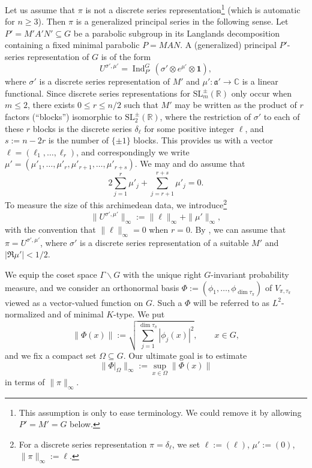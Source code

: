 \documentclass[11pt,oneside]{amsart}
\numberwithin{equation}{section}
\theoremstyle{remark}
\theoremstyle{plain}
\DeclareMathOperator{\Ind}{Ind}
\newcommand\SL{\mathrm{SL}}
\newcommand\RR{\mathbb{R}}
\newcommand\CC{\mathbb{C}}
\newcommand\mfa{\mathfrak{a}}
\newcommand\bs{\backslash}
\renewcommand\leq{\leqslant}
\renewcommand\geq{\geqslant}
\begin{document}
Let us assume that $\pi$ is not a discrete series representation\footnote{This assumption is only to ease terminology. We could remove it by allowing $P'=M'=G$ below.} (which is automatic for $n\geq 3$). Then $\pi$ is a generalized principal series in the following sense. Let $P' = M'A'N' \subseteq G$ be a parabolic subgroup in its Langlands decomposition containing
a fixed minimal parabolic $P = MAN$. A (generalized) principal $P'$-series representation of $G$ is of the form
\begin{equation}\label{eq:def-U-sigma'-mu'}
U^{\sigma',\mu'}=\Ind_{P'}^G(\sigma'\otimes e^{\mu'}\otimes\mathbf{1}),
\end{equation}
where $\sigma'$ is a discrete series representation of $M'$ and $\mu':\mfa'\to\CC$ is a linear functional. Since discrete series representations for $\SL_m^\pm(\RR)$ only occur when $m \leq 2$, there exists $0 \leq r \leq n/2$ such that $M'$ 
may be written as the product of $r$ factors (``blocks'') isomorphic to $\SL^{\pm}_2(\RR)$, where the restriction of $\sigma'$ to each 
of these $r$ blocks is the discrete series $\delta_{\ell}$ for some positive integer $\ell$,
and $s:=n- 2r$ is the number of $\{\pm 1\}$ blocks. This provides us with a vector ${\bm \ell} = (\ell_1, \ldots, \ell_r)$, and correspondingly we write $\mu' = (\mu'_1, \ldots, \mu'_r, \mu'_{r+ 1} , \ldots, \mu'_{r+s})$. We may and do assume that
\begin{equation}\label{eq:mu'-sum-0}
2\sum_{j=1}^{r} \mu'_j + \sum_{j=r+1}^{r+s} \mu'_j=0.
\end{equation}
To measure the size of this archimedean data, we introduce\footnote{For a discrete series representation $\pi=\delta_\ell$, we set $\bm\ell:=(\ell)$, $\mu':=(0)$, $\|\pi\|_\infty:=\ell$.}
\begin{equation}\label{eq:unorm}
\|U^{\sigma',\mu'}\|_{\infty} := \| \bm \ell\|_{\infty} + \| \mu' \|_{\infty},
\end{equation}
with the convention that $\|\bm \ell\|_\infty=0$ when $r=0$. By \cite[Th.~14.10.20]{GH}, we can assume that $\pi=U^{\sigma',\mu'}$, where $\sigma'$ is a discrete series representation of a suitable $M'$ and $|\Re\mu'|<1/2$.

We equip the coset space $\Gamma\bs G$ with the unique right $G$-invariant probability measure, and we consider an orthonormal basis 
$\Phi:=(\phi_1,\dotsc,\phi_{\dim \tau_{\pi}})$ of $V_{\pi,\tau_{\pi}}$ viewed as a vector-valued function on $G$. Such a $\Phi$ will be referred to as $L^2$-normalized and of minimal $K$-type. We put
\[
\|\Phi(x)\|:=\sqrt{\sum_{j=1}^{\dim\tau_{\pi}} |\phi_j(x)|^2},\qquad x\in G,
\]
and we fix a compact set $\Omega\subseteq G$. Our ultimate goal is to estimate
\[
\|\Phi|_{\Omega}\|_{\infty}:=\sup_{x\in\Omega} \|\Phi(x)\|
\]
in terms of $\|\pi\|_\infty$.
\end{document}
